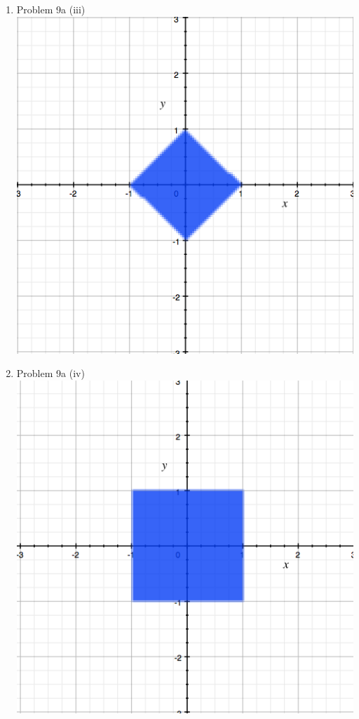 \documentclass[11pt]{article}
\newcommand{\solution}[1]{{{\color{blue}{\bf Solution:} {#1}}}}
\begin{document}
\begin{enumerate}
\item Problem 9a (iii)
\solution{}
\newline
\includegraphics[scale=0.4]{9a(iii)}

\item Problem 9a (iv)
\solution{}
\newline
\includegraphics[scale=0.4]{9a(iv)}

\end{enumerate}
\end{document}
